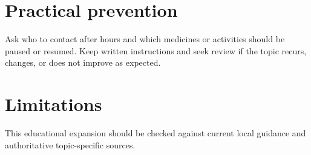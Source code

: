 \section*{Practical prevention}
Ask who to contact after hours and which medicines or activities should be paused or resumed. Keep written instructions and seek review if the topic recurs, changes, or does not improve as expected.

\section*{Limitations}
This educational expansion should be checked against current local guidance and authoritative topic-specific sources.
\clearpage

